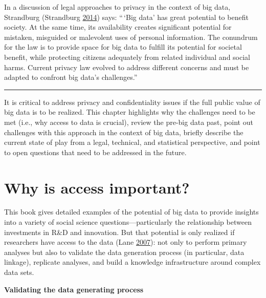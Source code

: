 \documentclass[]{krantz}
\begin{document}
In a discussion of legal approaches to privacy in the context of big
data, Strandburg (Strandburg
\protect\hyperlink{ref-Strandburg2014}{2014}) says: ``\,`Big data' has
great potential to benefit society. At the same time, its availability
creates significant potential for mistaken, misguided or malevolent uses
of personal information. The conundrum for the law is to provide space
for big data to fulfill its potential for societal benefit, while
protecting citizens adequately from related individual and social harms.
Current privacy law evolved to address different concerns and must be
adapted to confront big data's challenges.''

\begin{center}\rule{0.5\linewidth}{\linethickness}\end{center}

It is critical to address privacy and confidentiality issues if the full
public value of big data is to be realized. This chapter highlights why
the challenges need to be met (i.e., why access to data is crucial),
review the pre-big data past, point out challenges with this approach in
the context of big data, briefly describe the current state of play from
a legal, technical, and statistical perspective, and point to open
questions that need to be addressed in the future.

\section{Why is access important?}\label{why-is-access-important}

This book gives detailed examples of the potential of big data to
provide insights into a variety of social science
questions---particularly the relationship between investments in R\&D
and innovation. But that potential is only realized if researchers have
access to the data (Lane \protect\hyperlink{ref-Lane2007}{2007}): not
only to perform primary analyses but also to validate the data
generation process (in particular, data linkage), replicate analyses,
and build a knowledge infrastructure around complex data sets.

\textbf{Validating the data generating process}
\end{document}
